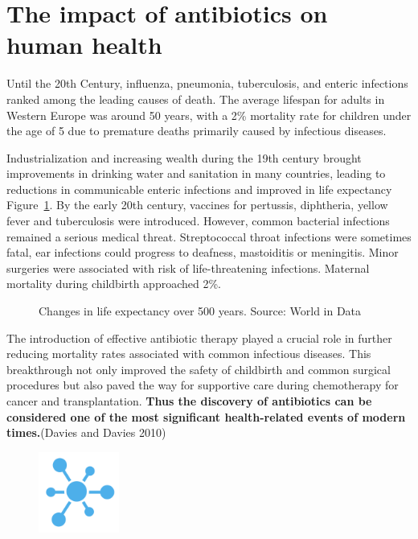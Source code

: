 \documentclass[
  letterpaper,
  DIV=11,
  numbers=noendperiod]{scrreprt}
\begin{document}
\hypertarget{the-impact-of-antibiotics-on-human-health}{%
\section*{The impact of antibiotics on human
health}\label{the-impact-of-antibiotics-on-human-health}}


Until the 20th Century, influenza, pneumonia, tuberculosis, and enteric
infections ranked among the leading causes of death. The average
lifespan for adults in Western Europe was around 50 years, with a 2\%
mortality rate for children under the age of 5 due to premature deaths
primarily caused by infectious diseases.

Industrialization and increasing wealth during the 19th century brought
improvements in drinking water and sanitation in many countries, leading
to reductions in communicable enteric infections and improved in life
expectancy Figure~\ref{fig-lifeexp}. By the early 20th century, vaccines
for pertussis, diphtheria, yellow fever and tuberculosis were
introduced. However, common bacterial infections remained a serious
medical threat. Streptococcal throat infections were sometimes fatal,
ear infections could progress to deafness, mastoiditis or meningitis.
Minor surgeries were associated with risk of life-threatening
infections. Maternal mortality during childbirth approached 2\%.

\begin{figure}

{\centering 

}

\caption{\label{fig-lifeexp}Changes in life expectancy over 500 years.
Source: World in Data}

\end{figure}

The introduction of effective antibiotic therapy played a crucial role
in further reducing mortality rates associated with common infectious
diseases. This breakthrough not only improved the safety of childbirth
and common surgical procedures but also paved the way for supportive
care during chemotherapy for cancer and transplantation. \textbf{Thus
the discovery of antibiotics can be considered one of the most
significant health-related events of modern times.}(Davies and Davies
2010)

\begin{figure}

{\centering \includegraphics[width=1.04167in,height=\textheight]{images/breakblue.png}

}

\end{figure}
\end{document}
